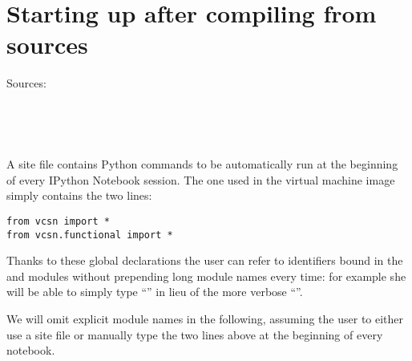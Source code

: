\section{Starting up after compiling from sources}


Sources:

\\

\\

A site file contains Python commands to be automatically run at the beginning
of every IPython Notebook session.  The one used in the virtual machine image
simply contains the two lines:
\begin{lstlisting}
from vcsn import *
from vcsn.functional import *
\end{lstlisting}
Thanks to these global declarations the user can refer to identifiers bound in
the  and  modules without prepending long module
names every time: for example she will be able to simply type
``''
in lieu of the more verbose
``''.

We will omit explicit module names in the following, assuming the user to
either use a site file or manually type the two  lines above at
the beginning of every notebook.
